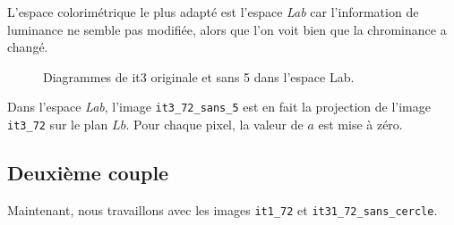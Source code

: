 \documentclass[a4paper,11pt]{article}
\begin{document}
L'espace colorimétrique le plus adapté est l'espace \textit{Lab} car 
l'information de luminance ne semble pas modifiée, alors que l'on 
voit bien que la chrominance a changé.

\begin{figure}[H]
  \begin{center}  
    \caption{Diagrammes de it3 originale et sans 5 dans l’espace Lab.}
  \end{center}
\end{figure}

Dans l'espace \textit{Lab}, l'image \texttt{it3\_72\_sans\_5} est en 
fait la projection de l'image \texttt{it3\_72} sur le plan $Lb$. Pour 
chaque pixel, la valeur de $a$ est mise à zéro.\\

\subsection{Deuxième couple}

Maintenant, nous travaillons avec les images \texttt{it1\_72} et 
\texttt{it31\_72\_sans\_cercle}.
\end{document}
